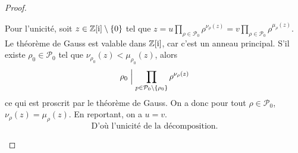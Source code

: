 \begin{proof}
\begin{enumerate}
		Pour l'unicité, soit $z\in\mathbb{Z}[\mathrm{i}]\setminus\left\{0\right\}$ tel que $z=u\prod_{\rho\in\mathcal{P}_{0}}\rho^{\nu_{\rho}(z)}=v\prod_{\rho\in\mathcal{P}_{0}}\rho^{\mu_{\rho}(z)}$. Le théorème de Gauss est valable dans $\mathbb{Z}[\mathrm{i}]$, car c'est un anneau principal. S'il existe $\rho_{0}\in\mathcal{P}_{0}$ tel que $\nu_{\rho_{0}}(z)<\mu_{\rho_{0}}(z)$, alors 
		\begin{equation}
			\rho_{0}\Bigm|\prod_{p\in\mathcal{P}_{0}\setminus\{\rho_{0}\}}\rho^{\nu_{\rho}(z)}
		\end{equation}
		ce qui est proscrit par le théorème de Gauss. On a donc pour tout $\rho\in\mathcal{P}_{0}$, $\nu_{\rho}(z)=\mu_{\rho}(z)$. En reportant, on a $u=v$.
		\begin{equation}
			\boxed{\text{D'où l'unicité de la décomposition.}}
		\end{equation}
	\end{enumerate}
\end{proof}


